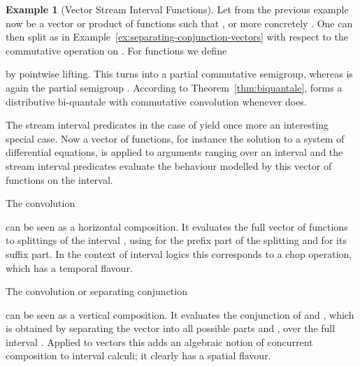 \documentclass[12pt]{article}
\theoremstyle{definition}
\newtheorem{example}{Example}
\begin{document}
\begin{example}[Vector Stream Interval Functions]\label{ex:vector-stream-interval-functions}
  Let  from the previous example now be a vector or product of
  functions  such that , or more concretely
  . One can then split  as in
  Example~\ref{ex:separating-conjunction-vectors} with respect to the
  commutative operation  on . For functions 
  we define
  
  by pointwise lifting. This turns  into a
  partial commutative semigroup, whereas  is again the
  partial semigroup . According to
  Theorem~\ref{thm:biquantale},  forms a
  distributive bi-quantale with commutative convolution 
  whenever  does.

  The stream interval predicates in the case of  yield
  once more an interesting special case.  Now a vector of functions,
  for instance the solution to a system of differential equations, is
  applied to arguments ranging over an interval and the stream
  interval predicates evaluate the behaviour modelled by this vector
  of functions on the interval. 

  The convolution
  
  can be seen as a horizontal composition. It evaluates the full vector
  of functions to splittings of the interval , using  for the
  prefix part of the splitting and  for its suffix part.  In the
  context of interval logics this corresponds to a chop operation,
  which has a temporal flavour.
  
  The convolution or separating conjunction
  
  can be seen as a vertical composition. It evaluates the conjunction
  of  and , which is obtained by separating the vector  into
  all possible parts  and , over the full interval .  Applied
  to vectors this adds an algebraic notion of concurrent composition
  to interval calculi; it clearly has a spatial flavour. 


\end{example}
\end{document}

